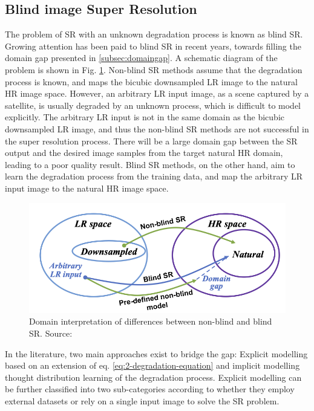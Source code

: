     \subsection{Blind image Super Resolution}

        The problem of SR with an unknown degradation process is known as blind SR. 
        Growing attention has been paid to blind SR in recent years, towards filling the domain gap presented in \ref{subsec:domaingap}.
        A schematic diagram of the problem is shown in Fig. \ref{fig:2-DomainGap}. 
        Non-blind SR methods assume that the degradation process is known, and maps the bicubic downsampled LR image to the natural HR image space.
        However, an arbitrary LR input image, as a scene captured by a satellite, is usually degraded by an unknown process, which is difficult to model explicitly.
        The arbitrary LR input is not in the same domain as the bicubic downsampled LR image, and thus the non-blind SR methods are not successful in the super resolution process.
        There will be a large domain gap between the SR output and the desired image samples from the target natural HR domain, leading to a poor quality result.
        Blind SR methods, on the other hand, aim to learn the degradation process from the training data, and map the arbitrary LR input image to the natural HR image space.
        
        \begin{figure}[H]
            \centering
            \includegraphics[width=\textwidth]{Includes/2-DomainGap.png}
            \caption{Domain interpretation of differences between non-blind and blind SR. Source: \cite{liu2021blind}}
            \label{fig:2-DomainGap}
        \end{figure}

        In the literature, two main approaches exist to bridge the gap: 
        Explicit modelling based on an extension of eq. \ref{eq:2-degradation-equation} and implicit modelling thought distribution learning of the degradation process.
        Explicit modelling can be further classified into two sub-categories according to whether they employ external datasets or rely on a single input image to solve the SR problem.


